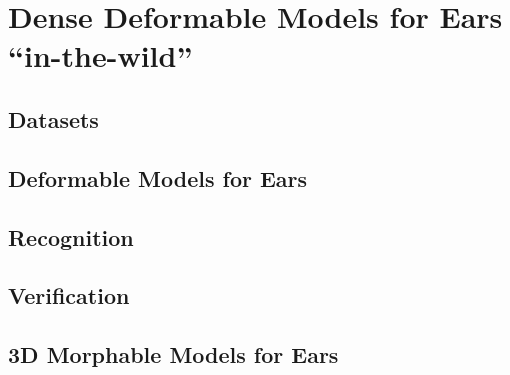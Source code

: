 \chapter{Dense Deformable Models for Ears ``in-the-wild''}

\section{Datasets}

\section{Deformable Models for Ears}

\section{Recognition}

\section{Verification}

\section{3D Morphable Models for Ears}